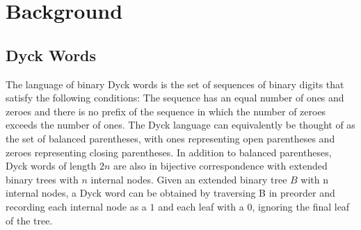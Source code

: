 \section{Background}
\subsection{Dyck Words}
The language of binary Dyck words is the set of sequences of binary digits that satisfy the following conditions: The sequence has an equal number of ones and zeroes and there is no prefix of the sequence in which the number of zeroes exceeds the number of ones.  The Dyck language can equivalently be thought of as the set of balanced parentheses, with ones representing open parentheses and zeroes representing closing parentheses.  
In addition to balanced parentheses, Dyck words of length $2n$ are also in bijective correspondence with extended binary trees with $n$ internal nodes. 
Given an extended binary tree $B$ with n internal nodes, a Dyck word can be obtained by traversing B in preorder and recording each internal node as a $1$ and each leaf with a $0$, ignoring the final leaf of the tree.




